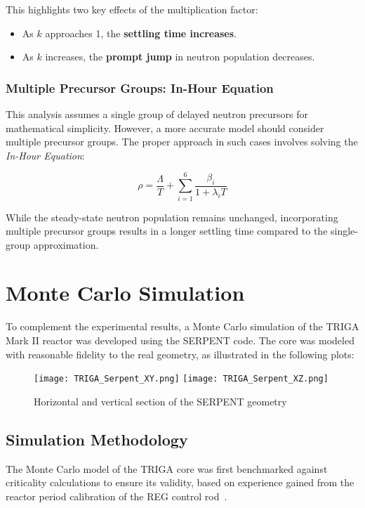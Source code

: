 This highlights two key effects of the multiplication factor:
\begin{itemize}
    \item As $ k $ approaches 1, the \textbf{settling time increases}.
    \item As  $ k $ increases, the \textbf{prompt jump} in neutron population decreases.
\end{itemize}

\subsubsection{Multiple Precursor Groups: In-Hour Equation}

This analysis assumes a single group of delayed neutron precursors for mathematical simplicity. However, a more accurate model should consider multiple precursor groups. The proper approach in such cases involves solving the \textit{In-Hour Equation}:

\begin{equation}
    \rho = \frac{\Lambda}{T} + \sum_{i=1}^{6} \frac{\beta_i}{1 + \lambda_i T}
\end{equation}

While the steady-state neutron population remains unchanged, incorporating multiple precursor groups results in a longer settling time compared to the single-group approximation.
\section{Monte Carlo Simulation}

To complement the experimental results, a Monte Carlo simulation of the TRIGA Mark II reactor was developed using the SERPENT code. The core was modeled with reasonable fidelity to the real geometry, as illustrated in the following plots:

\begin{figure}[H]
    \centering
    \texttt{[image: TRIGA\_Serpent\_XY.png]}
    \texttt{[image: TRIGA\_Serpent\_XZ.png]}
    \caption{Horizontal and vertical section of the SERPENT geometry}
    \label{fig:triga_geometry}
\end{figure}

\subsection{Simulation Methodology}

The Monte Carlo model of the TRIGA core was first benchmarked against criticality calculations to ensure its validity, based on experience gained from the reactor period calibration of the REG control rod~\cite{Lorenzi2024}.

